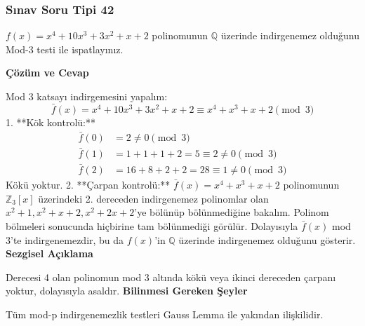 \documentclass[11pt, a4paper]{article}
\newenvironment{cozum}{
    \vspace{0.5cm}
    \noindent\textcolor{green!60!black}{\faCheckCircle\enspace \textbf{\Large Çözüm ve Cevap}}\par\vspace{0.2cm}
}{}
\newenvironment{sezgisel}{
    \vspace{0.5cm}
    \noindent\textcolor{orange!80!black}{\faLightbulb\enspace \textbf{\Large Sezgisel Açıklama}}\par\vspace{0.2cm}
    \itshape
}{}
\newenvironment{bilgi}{
    \vspace{0.5cm}
    \noindent\textcolor{red!70!black}{\faExclamationTriangle\enspace \textbf{\Large Bilinmesi Gereken Şeyler}}\par\vspace{0.2cm}
}{}
\begin{document}
\newpage
\subsubsection{Sınav Soru Tipi 42}
\begin{sinavbox}
$f(x) = x^4+10x^3+3x^2+x+2$ polinomunun $\mathbb{Q}$ üzerinde indirgenemez olduğunu Mod-3 testi ile ispatlayınız.
\end{sinavbox}
\begin{cozum}
Mod 3 katsayı indirgemesini yapalım:
\[ \bar{f}(x) = x^4 + 10x^3 + 3x^2 + x + 2 \equiv x^4 + x^3 + x + 2 \pmod 3 \]
1. **Kök kontrolü:**
\begin{align*}
\bar{f}(0) &= 2 \neq 0 \pmod 3 \\
\bar{f}(1) &= 1 + 1 + 1 + 2 = 5 \equiv 2 \neq 0 \pmod 3 \\
\bar{f}(2) &= 16 + 8 + 2 + 2 = 28 \equiv 1 \neq 0 \pmod 3
\end{align*}
Kökü yoktur.
2. **Çarpan kontrolü:**
$\bar{f}(x) = x^4+x^3+x+2$ polinomunun $\mathbb{Z}_3[x]$ üzerindeki 2. dereceden indirgenemez polinomlar olan $x^2+1, x^2+x+2, x^2+2x+2$'ye bölünüp bölünmediğine bakalım. Polinom bölmeleri sonucunda hiçbirine tam bölünmediği görülür.
Dolayısıyla $\bar{f}(x)$ mod 3'te indirgenemezdir, bu da $f(x)$'in $\mathbb{Q}$ üzerinde indirgenemez olduğunu gösterir.
\end{cozum}
\begin{sezgisel}
Derecesi 4 olan polinomun mod 3 altında kökü veya ikinci dereceden çarpanı yoktur, dolayısıyla asaldır.
\end{sezgisel}
\begin{bilgi}
Tüm mod-p indirgenemezlik testleri Gauss Lemma ile yakından ilişkilidir.
\end{bilgi}

\newpage
\end{document}
